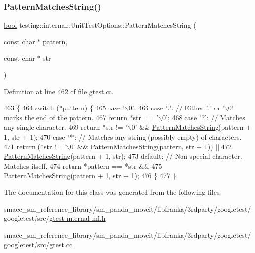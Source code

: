 \subsubsection{\texorpdfstring{Pattern\+Matches\+String()}{PatternMatchesString()}}
{\footnotesize\ttfamily \hyperlink{classbool}{bool} testing\+::internal\+::\+Unit\+Test\+Options\+::\+Pattern\+Matches\+String (\begin{DoxyParamCaption}\item[{const char $\ast$}]{pattern,  }\item[{const char $\ast$}]{str }\end{DoxyParamCaption})\hspace{0.3cm}{\ttfamily [static]}}



Definition at line 462 of file gtest.\+cc.


\begin{DoxyCode}
463                                                             \{
464   \textcolor{keywordflow}{switch} (*pattern) \{
465     \textcolor{keywordflow}{case} \textcolor{charliteral}{'\(\backslash\)0'}:
466     \textcolor{keywordflow}{case} \textcolor{charliteral}{':'}:  \textcolor{comment}{// Either ':' or '\(\backslash\)0' marks the end of the pattern.}
467       \textcolor{keywordflow}{return} *str == \textcolor{charliteral}{'\(\backslash\)0'};
468     \textcolor{keywordflow}{case} \textcolor{charliteral}{'?'}:  \textcolor{comment}{// Matches any single character.}
469       \textcolor{keywordflow}{return} *str != \textcolor{charliteral}{'\(\backslash\)0'} && \hyperlink{classtesting_1_1internal_1_1UnitTestOptions_af0235a2ee26dd6db21305e11d2358e4f}{PatternMatchesString}(pattern + 1, str + 1);
470     \textcolor{keywordflow}{case} \textcolor{charliteral}{'*'}:  \textcolor{comment}{// Matches any string (possibly empty) of characters.}
471       \textcolor{keywordflow}{return} (*str != \textcolor{charliteral}{'\(\backslash\)0'} && \hyperlink{classtesting_1_1internal_1_1UnitTestOptions_af0235a2ee26dd6db21305e11d2358e4f}{PatternMatchesString}(pattern, str + 1)) ||
472           \hyperlink{classtesting_1_1internal_1_1UnitTestOptions_af0235a2ee26dd6db21305e11d2358e4f}{PatternMatchesString}(pattern + 1, str);
473     \textcolor{keywordflow}{default}:  \textcolor{comment}{// Non-special character.  Matches itself.}
474       \textcolor{keywordflow}{return} *pattern == *str &&
475           \hyperlink{classtesting_1_1internal_1_1UnitTestOptions_af0235a2ee26dd6db21305e11d2358e4f}{PatternMatchesString}(pattern + 1, str + 1);
476   \}
477 \}
\end{DoxyCode}


The documentation for this class was generated from the following files\+:\begin{DoxyCompactItemize}
\item 
smacc\+\_\+sm\+\_\+reference\+\_\+library/sm\+\_\+panda\+\_\+moveit/libfranka/3rdparty/googletest/googletest/src/\hyperlink{gtest-internal-inl_8h}{gtest-\/internal-\/inl.\+h}\item 
smacc\+\_\+sm\+\_\+reference\+\_\+library/sm\+\_\+panda\+\_\+moveit/libfranka/3rdparty/googletest/googletest/src/\hyperlink{gtest_8cc}{gtest.\+cc}\end{DoxyCompactItemize}
